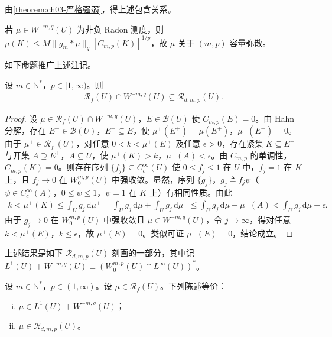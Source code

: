 \documentclass[../../main.tex]{subfiles}%
\begin{document}
由\cref{theorem:ch03-严格强弱}，得上述包含关系。

若 $\mu\in W^{-m,q}(U)$ 为非负 Radon 测度，则 $\mu(K)\leqslant M\|g_m*\mu\|_q[C_{m,p}(K)]^{1/p}$，故 $\mu$ 关于 $(m,p)$-容量弥散。

如下命题推广上述注记。

\begin{proposition}[Gr\"un--Rehomme]\label{proposition:ch03-GrunRehomme}
设 $m\in\mathbb{N}^*$，$p\in[1,\infty)$。则
\begin{align*}
\mathscr{R}_f(U)\cap W^{-m,q}(U)\subseteq\mathscr{R}_{d,m,p}(U).
\end{align*}
\end{proposition}

\begin{proof}
设 $\mu\in\mathscr{R}_f(U)\cap W^{-m,q}(U)$，$E\in\mathcal{B}(U)$ 使 $C_{m,p}(E)=0$。由 Hahn 分解，存在 $E^+\in\mathcal{B}(U)$，$E^+\subseteq E$，使 $\mu^+(E^+)=\mu(E^+)$，$\mu^-(E^+)=0$。由于 $\mu^\pm\in\mathscr{R}^+_f(U)$，对任意 $0<k<\mu^+(E)$ 及任意 $\epsilon>0$，存在紧集 $K\subseteq E^+$ 与开集 $A\supseteq E^+$，$A\subseteq U$，使 $\mu^+(K)>k$，$\mu^-(A)<\epsilon$。由 $C_{m,p}$ 的单调性，$C_{m,p}(K)=0$。则存在序列 $\{f_j\}\subseteq C^\infty_c(U)$ 使 $0\leqslant f_j\leqslant1$ 在 $U$ 中，$f_j=1$ 在 $K$ 上，且 $f_j\to0$ 在 $W^{m,p}_0(U)$ 中强收敛。显然，序列 $\{g_j\}$，$g_j\triangleq f_j\psi$（$\psi\in C^\infty_c(A)$，$0\leqslant\psi\leqslant1$，$\psi=1$ 在 $K$ 上）有相同性质。由此
\begin{align*}
k<\mu^+(K)\leqslant\int_U g_j\,\mathrm{d}\mu^+
=\int_U g_j\,\mathrm{d}\mu+\int_U g_j\,\mathrm{d}\mu^-
\leqslant\int_U g_j\,\mathrm{d}\mu+\mu^-(A)
<\int_U g_j\,\mathrm{d}\mu+\epsilon.
\end{align*}
由于 $g_j\to0$ 在 $W^{m,p}_0(U)$ 中强收敛且 $\mu\in W^{-m,q}(U)$，令 $j\to\infty$，得对任意 $k<\mu^+(E)$，$k\leqslant\epsilon$，故 $\mu^+(E)=0$。类似可证 $\mu^-(E)=0$，结论成立。
\end{proof}

上述结果是如下 $\mathscr{R}_{d,m,p}(U)$ 刻画的一部分，其中记 $L^1(U)+W^{-m,q}(U)\equiv(W^{m,p}_0(U)\cap L^\infty(U))^*$。

\begin{theorem}\label{theorem:ch03-Lp可解性}\label{theorem:ch03-奇性}
设 $m\in\mathbb{N}^*$，$p\in(1,\infty)$。设 $\mu\in\mathscr{R}_f(U)$。下列陈述等价：
\begin{enumerate}[(i)]
\item $\mu\in L^1(U)+W^{-m,q}(U)$；
\item $\mu\in\mathscr{R}_{d,m,p}(U)$。
\end{enumerate}
\end{theorem}
\end{document}

